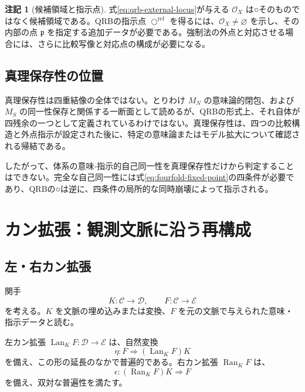 \documentclass[a4paper,11pt]{ltjsarticle}
\theoremstyle{definition}
\newtheorem{remark}[definition]{注記}
\theoremstyle{plain}
\newcommand{\CircleRef}{\bigcirc^{\mathrm{ref}}}
\newcommand{\Lan}{\operatorname{Lan}}
\newcommand{\Ran}{\operatorname{Ran}}
\begin{document}
\begin{remark}[候補領域と指示点]
式\eqref{eq:qrb-external-locus}が与える $\mathcal O_X$ は○そのものではなく候補領域である。QRBの指示点 $\CircleRef$ を得るには、$\mathcal O_X\neq\varnothing$ を示し、その内部の点 $\mathfrak p$ を指定する追加データが必要である。強制法の外点と対応させる場合には、さらに比較写像と対応点の構成が必要になる。
\end{remark}

\subsection{真理保存性の位置}

真理保存性は四重結像の全体ではない。とりわけ $M_N$ の意味論的閉包、および $M_S$ の同一性保存と関係する一断面として読めるが、QRBの形式上、それ自体が四残余の一つとして定義されているわけではない。真理保存性は、四つの比較構造と外点指示が設定された後に、特定の意味論またはモデル拡大について確認される帰結である。

したがって、体系の意味‐指示的自己同一性を真理保存性だけから判定することはできない。完全な自己同一性には式\eqref{eq:fourfold-fixed-point}の四条件が必要であり、QRBの○は逆に、四条件の局所的な同時崩壊によって指示される。

\section{カン拡張：観測文脈に沿う再構成}

\subsection{左・右カン拡張}

関手
\begin{equation}
 K:\mathcal C\to\mathcal D,
 \qquad
 F:\mathcal C\to\mathcal E
\end{equation}
を考える。$K$ を文脈の埋め込みまたは変換、$F$ を元の文脈で与えられた意味・指示データと読む。

左カン拡張 $\Lan_KF:\mathcal D\to\mathcal E$ は、自然変換
\begin{equation}
 \eta:F\Longrightarrow (\Lan_KF)K
\end{equation}
を備え、この形の延長のなかで普遍的である。右カン拡張 $\Ran_KF$ は、
\begin{equation}
 \epsilon:(\Ran_KF)K\Longrightarrow F
\end{equation}
を備え、双対な普遍性を満たす\cite{MacLane1998,Riehl2016}。
\end{document}
